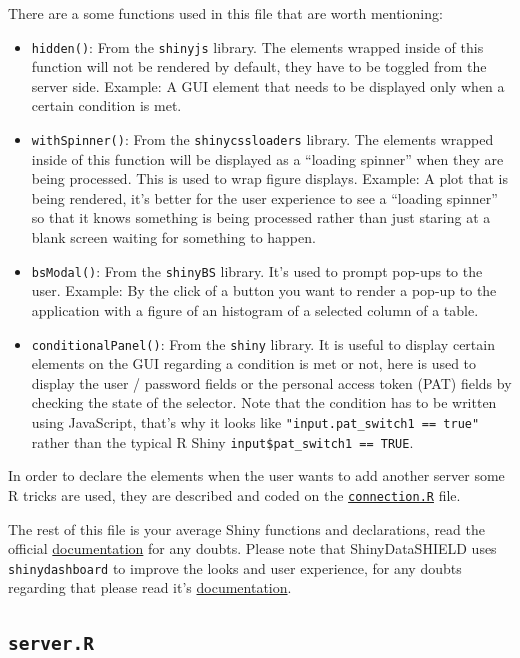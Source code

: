 \documentclass[
]{book}
\providecommand{\tightlist}{%
  \setlength{\itemsep}{0pt}\setlength{\parskip}{0pt}}
\begin{document}
There are a some functions used in this file that are worth mentioning:

\begin{itemize}
\tightlist
\item
  \texttt{hidden()}: From the \texttt{shinyjs} library. The elements wrapped inside of this function will not be rendered by default, they have to be toggled from the server side. Example: A GUI element that needs to be displayed only when a certain condition is met.
\item
  \texttt{withSpinner()}: From the \texttt{shinycssloaders} library. The elements wrapped inside of this function will be displayed as a ``loading spinner'' when they are being processed. This is used to wrap figure displays. Example: A plot that is being rendered, it's better for the user experience to see a ``loading spinner'' so that it knows something is being processed rather than just staring at a blank screen waiting for something to happen.
\item
  \texttt{bsModal()}: From the \texttt{shinyBS} library. It's used to prompt pop-ups to the user. Example: By the click of a button you want to render a pop-up to the application with a figure of an histogram of a selected column of a table.
\item
  \texttt{conditionalPanel()}: From the \texttt{shiny} library. It is useful to display certain elements on the GUI regarding a condition is met or not, here is used to display the user / password fields or the personal access token (PAT) fields by checking the state of the selector. Note that the condition has to be written using JavaScript, that's why it looks like \texttt{"input.pat\_switch1\ ==\ true"} rather than the typical R Shiny \texttt{input\$pat\_switch1\ ==\ TRUE}.
\end{itemize}

In order to declare the elements when the user wants to add another server some R tricks are used, they are described and coded on the \protect\hyperlink{connection}{\texttt{connection.R}} file.

The rest of this file is your average Shiny functions and declarations, read the official \href{https://shiny.rstudio.com/reference/shiny/1.4.0/}{documentation} for any doubts. Please note that ShinyDataSHIELD uses \texttt{shinydashboard} to improve the looks and user experience, for any doubts regarding that please read it's \href{https://rstudio.github.io/shinydashboard/get_started.html}{documentation}.

\hypertarget{server.r}{%
\subsection{\texorpdfstring{\texttt{server.R}}{server.R}}\label{server.r}}
\end{document}
